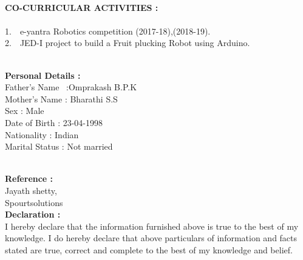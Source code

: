 \documentclass[1pt]{article}
\begin{document}
\begin{flushleft}
\begin{flushleft}
			
			\hspace{1cm}\\ \hspace{1cm}
			
			
			{\small \textbf{CO-CURRICULAR ACTIVITIES :}}\\ \ \\
			1.\ \ e-yantra Robotics competition (2017-18),(2018-19).\\	
			2.\ \ JED-I project to build a Fruit plucking Robot using Arduino.\\
			
			
			\hspace{1cm}\\ \hspace{1cm}
			
			
			{\small \textbf{ Personal Details :}}\\
			\hspace{1cm}Father's Name \ :Omprakash B.P.K\\	
			\hspace{1cm}Mother's Name : Bharathi S.S\\
			\hspace{1cm}Sex : Male\\	
			\hspace{1cm}Date of Birth : 23-04-1998\\
			\hspace{1cm}Nationality : Indian\\
			\hspace{1cm}Marital Status : Not married\\
			
			\hspace{1cm}\\ \hspace{1cm}
			
			{\small \textbf{Reference :}}\\
			\hspace{1cm} Jayath shetty,\\	
			\hspace{1cm} Spourtsolutions\\
			  
			{\small \textbf{Declaration : }}\\
			\hspace{1cm}I hereby declare that the information furnished above is true to the best of my knowledge. I do hereby declare that above particulars of information and facts stated are true, correct and complete to the best of my knowledge and belief.\\ 
		
			
		\end{flushleft}
	
	\end{flushleft}
	
\end{document}
